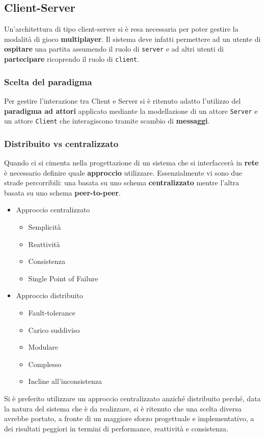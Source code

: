 \subsection{Client-Server} 
Un'architettura di tipo client-server si è resa necessaria per poter gestire la modalità di gioco \textbf{multiplayer}. Il sistema deve infatti permettere ad un utente di \textbf{ospitare} una partita assumendo il ruolo di \texttt{server} e ad altri utenti di \textbf{partecipare} ricoprendo il ruolo di \texttt{client}. 

\subsubsection{Scelta del paradigma}
Per gestire l'interazione tra Client e Server si è ritenuto adatto l'utilizzo del \textbf{paradigma ad attori} applicato mediante la modellazione di un attore \texttt{Server} e un attore \texttt{Client} che interagiscono tramite scambio di \textbf{messaggi}. 

\subsubsection{Distribuito vs centralizzato}
Quando ci si cimenta nella progettazione di un sistema che si interfaccerà in \textbf{rete} è necessario definire quale \textbf{approccio} utilizzare. Essenzialmente vi sono due strade percorribili: una basata su uno schema \textbf{centralizzato} mentre l'altra basata su uno schema \textbf{peer-to-peer}.
\begin{itemize}
    \item Approccio centralizzato
        \begin{itemize}
        \setlength\itemsep{0em}
        \item Semplicità
        \item Reattività
        \item Consistenza
        \item Single Point of Failure
    \end{itemize}
    
    \item Approccio distribuito
        \begin{itemize}
        \setlength\itemsep{0em}
        \item Fault-tolerance
        \item Carico suddiviso
        \item Modulare
        \item Complesso
        \item Incline all'inconsistenza
        
    \end{itemize}
\end{itemize}
Si è preferito utilizzare un approccio centralizzato anziché distribuito perché, data la natura del sistema che è da realizzare, si è ritenuto che una scelta diversa avrebbe portato, a fronte di un maggiore sforzo progettuale e implementativo, a dei risultati peggiori in termini di performance, reattività e consistenza.


